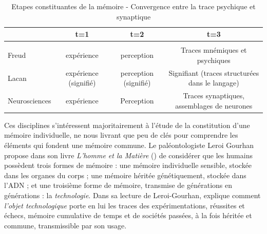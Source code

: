{\small
\begin{table}[htbp]
    \centering
    \begin{tabulary}{\textwidth}{L|C C C}
        
        ~ & t=1  & t=2  & t=3 \\[2ex]
        
        \hline \\ [-1.5ex]
    
        Freud  & expérience  & perception  & Traces mnémiques et psychiques \\[3ex]

        Lacan & expérience (signifié)  &   perception (signifié)  &   Signifiant (traces structurées dans le langage) \\[3ex]

        Neurosciences &  expérience & Perception & Traces synaptiques, assemblages de neurones \\[3ex]

    \end{tabulary}

    \caption{ Etapes constituantes de la mémoire - Convergence entre la trace psychique et synaptique \citep{Ansermet2004} }
\end{table}}

Ces disciplines s{\textquoteright}intéressent majoritairement à l{\textquoteright}étude de la constitution d{\textquoteright}une mémoire individuelle, ne nous livrant que peu de clés pour comprendre les éléments qui fondent une mémoire commune. Le paléontologiste Leroi Gourhan propose dans son livre \textit{L{\textquoteright}homme et la Matière} (\citeyear{Leroi-Gourhan1971}) de considérer que les humains possèdent trois formes de mémoire : une mémoire individuelle sensible, stockée dans les organes du corps ; une mémoire héritée génétiquement, stockée dans l{\textquoteright}ADN ; et une troisième forme de mémoire, transmise de générations en générations : la \textit{technologie}. Dans sa lecture de Leroi-Gourhan, \cite{Stiegler1998b} explique comment \textit{l{\textquoteright}objet technologique} porte en lui les traces des expérimentations, réussites et échecs, mémoire cumulative de temps et de sociétés passées, à la fois héritée et commune, transmissible par son usage.

